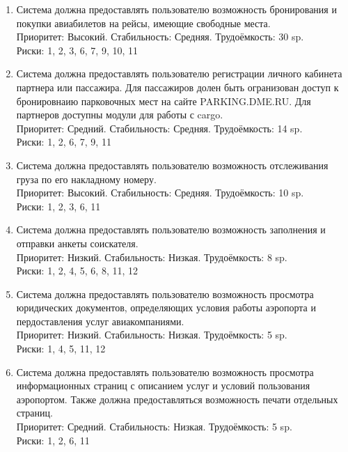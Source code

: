 \begin{enumerate}
      \item Система должна предоставлять пользователю возможность бронирования
            и покупки авиабилетов на рейсы, имеющие
            свободные места. \\
            Приоритет: Высокий. Стабильность: Средняя. Трудоёмкость: 30 sp.\\
            Риски: 1, 2, 3, 6, 7, 9, 10, 11

      \item Система должна предоставлять пользователю
            регистрации личного кабинета партнера или
            пассажира. Для пассажиров долен быть
            огранизован доступ к бронировнаию парковочных
            мест на сайте PARKING.DME.RU. Для партнеров
            доступны модули для работы с cargo. \\
            Приоритет: Средний. Стабильность: Средняя. Трудоёмкость: 14 sp.\\
            Риски: 1, 2, 6, 7, 9, 11

      \item Система должна предоставлять пользователю возможность
            отслеживания груза по его накладному номеру. \\
            Приоритет: Высокий. Стабильность: Средняя. Трудоёмкость: 10 sp.\\
            Риски: 1, 2, 3, 6, 11

      \item Система должна предоставлять пользователю возможность
            заполнения и отправки анкеты соискателя. \\
            Приоритет: Низкий. Стабильность: Низкая. Трудоёмкость: 8 sp.\\
            Риски: 1, 2, 4, 5, 6, 8, 11, 12

      \item Система должна предоставлять пользователю возможность
            просмотра юридических документов, определяющих
            условия работы аэропорта и пердоставления
            услуг авиакомпаниями. \\
            Приоритет: Низкий. Стабильность: Низкая. Трудоёмкость: 5 sp.\\
            Риски: 1, 4, 5, 11, 12

      \item Система должна предоставлять пользователю возможность просмотра
            информационных страниц с описанием услуг и
            условий пользования аэропортом. Также должна
            предоставляться возможность печати отдельных
            страниц. \\
            Приоритет: Средний. Стабильность: Низкая. Трудоёмкость: 5 sp.\\
            Риски: 1, 2, 6, 11

\end{enumerate}
